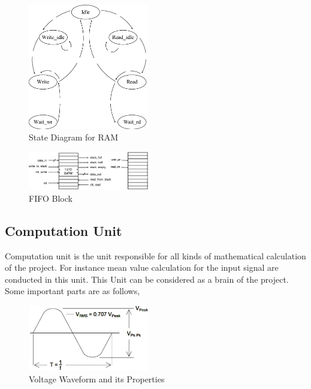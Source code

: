 \documentclass[paper]{IEEEtran}
\begin{document}
	\begin{figure}[h!]
		\setlength{\unitlength}{\textwidth}
		\center 
		\includegraphics[width=0.47\textwidth]{RAM_state}
		\caption{\label{fig:RAM State} State Diagram for RAM}
	\end{figure}
	
	\begin{figure}[h!]
		\setlength{\unitlength}{\textwidth}
		\center 
		\includegraphics[width=0.47\textwidth]{fifo_ports}
		\caption{\label{fig:fifo_ports} FIFO Block}
	\end{figure}
	
	
	\subsection{Computation Unit} \- \indent
	Computation unit is the unit responsible for all kinds of mathematical calculation of the project. For instance mean value calculation for the input signal are conducted in this unit. This Unit can be considered as a brain of the project. Some important parts are as follows,	
	
	\begin{figure}[h!]
		\setlength{\unitlength}{\textwidth}
		\center 
		\includegraphics[width=0.47\textwidth]{voltage}
		\caption{\label{fig:waveform} Voltage Waveform and its Properties}
	\end{figure}
	
\end{document}
